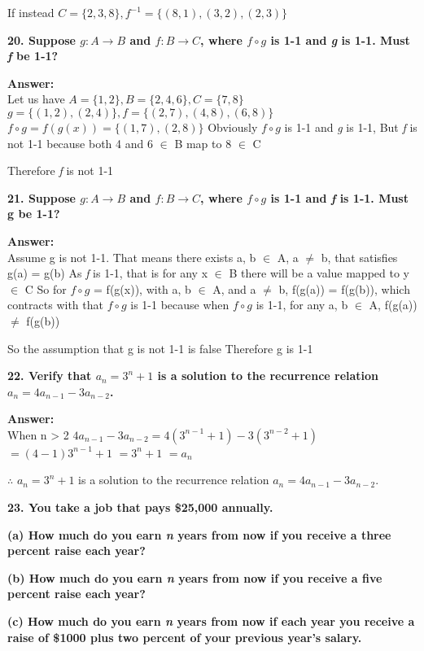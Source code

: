 \documentclass{article}
\begin{document}
\begin{large}
If instead $C = \{2,3,8\}, f^{-1} = \{(8,1),(3,2),(2,3)\}$


\textbf{20. Suppose $g:A\to B$ and $f:B\to C$, where $f\circ g$ is 1-1 and \emph{g} is 1-1. Must \emph{f} be 1-1?}

\textbf{Answer:} \\

Let us have $A = \{1,2\}, B = \{2,4,6\}, C = \{7,8\}$
$g = \{(1,2), (2,4)\}, f = \{(2,7), (4,8), (6,8)\}$
$f\circ g = f(g(x)) = \{(1,7), (2,8)\}$
Obviously $f\circ g$ is 1-1 and \emph{g} is 1-1,
But \emph{f} is not 1-1 because both 4 and 6 $\in$ B map to 8 $\in$ C

Therefore \emph{f} is not 1-1


\textbf{21. Suppose $g:A\to B$ and $f:B\to C$, where $f\circ g$ is 1-1 and \emph{f} is 1-1. Must g be 1-1?}

\textbf{Answer:} \\

Assume g is not 1-1. That means there exists a, b $\in$ A, a $\neq$ b, that satisfies g(a) = g(b)
As \emph{f} is 1-1, that is for any x $\in$ B there will be a value mapped to y $\in$ C
So for $f\circ g$ = f(g(x)), with a, b $\in$ A, and a $\neq$ b, f(g(a)) = f(g(b)), which contracts with that $f\circ g$ is 1-1
because when $f\circ g$ is 1-1, for any a, b $\in$ A, f(g(a)) $\neq$ f(g(b))

So the assumption that g is not 1-1 is false
Therefore g is 1-1


\textbf{22. Verify that $a_{n}={3^{n}+1}$ is a solution to the recurrence relation $a_{n}=4a_{n-1}-3a_{n-2}$.}

\textbf{Answer:} \\

When n > 2
$4a_{n-1}-3a_{n-2} = 4 (3^{n-1} + 1) - 3 (3^{n-2} + 1)$
                    $= (4 - 1) 3^{n-1} + 1$
                    $= 3^{n} + 1$
                    $= a_{n}$

$\therefore$ $a_{n}={3^{n}+1}$ is a solution to the recurrence relation $a_{n}=4a_{n-1}-3a_{n-2}$.


\textbf{23. You take a job that pays \$25,000 annually.}

\textbf{(a) How much do you earn \emph{n} years from now if you receive a three percent raise each year?}

\textbf{(b) How much do you earn \emph{n} years from now if you receive a five percent raise each year? }

\textbf{(c) How much do you earn \emph{n} years from now if each year you receive a raise of \$1000 plus two percent of your previous year's salary.}


\end{large}
\end{document}

